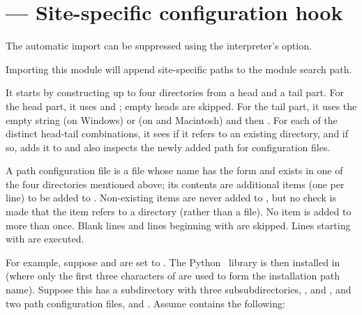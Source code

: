 \section{ ---
         Site-specific configuration hook}



The automatic import can be suppressed using the interpreter's
 option.

Importing this module will append site-specific paths to the module
search path.

It starts by constructing up to four directories from a head and a
tail part.  For the head part, it uses  and
; empty heads are skipped.  For
the tail part, it uses the empty string (on Windows) or
 (on \UNIX{} and Macintosh)
and then .  For each of the distinct
head-tail combinations, it sees if it refers to an existing directory,
and if so, adds it to  and also inspects the newly added 
path for configuration files.

A path configuration file is a file whose name has the form
 and exists in one of the four directories
mentioned above; its contents are additional items (one
per line) to be added to .  Non-existing items are
never added to , but no check is made that the item
refers to a directory (rather than a file).  No item is added to
 more than once.  Blank lines and lines beginning with
\code{\#} are skipped.  Lines starting with  are executed.

For example, suppose  and  are
set to .  The Python \version\ library is then
installed in  (where only the
first three characters of  are used to form the
installation path name).  Suppose this has a subdirectory
 with three
subsubdirectories, ,  and , and two
path configuration files,  and .  Assume
 contains the following:

